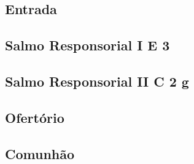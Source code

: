 
\subsection{Entrada}\label{subsection:hebdomada-sancta/missa-chrismatis/introitus}

\subsection[Salmo Responsorial I]{Salmo Responsorial I \textmd{E 3}}\label{subsection:hebdomada-sancta/missa-chrismatis/psalmus-responsorius-1}

\AllowPageFlush

\subsection[Salmo Responsorial II]{Salmo Responsorial II \textmd{C 2 g}}\label{subsection:hebdomada-sancta/missa-chrismatis/psalmus-responsorius-2}

\AllowPageBreak

\subsection{Ofertório}\label{subsection:hebdomada-sancta/missa-chrismatis/offertorium}

\AllowPageFlush

\subsection{Comunhão}\label{subsection:hebdomada-sancta/missa-chrismatis/communio}
